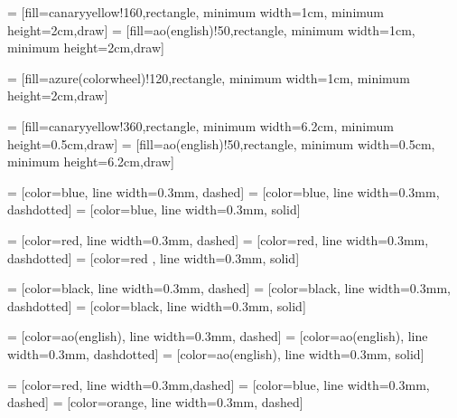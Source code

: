  = [fill=canaryyellow!160,rectangle, minimum width=1cm, minimum height=2cm,draw]
 = [fill=ao(english)!50,rectangle, minimum width=1cm, minimum height=2cm,draw]

 = [fill=azure(colorwheel)!120,rectangle, minimum width=1cm, minimum height=2cm,draw]

 = [fill=canaryyellow!360,rectangle, minimum width=6.2cm, minimum height=0.5cm,draw]
 = [fill=ao(english)!50,rectangle, minimum width=0.5cm, minimum height=6.2cm,draw]




                = [color=blue, line width=0.3mm, dashed]
   = [color=blue, line width=0.3mm, dashdotted]
  = [color=blue, line width=0.3mm, solid]

                = [color=red, line width=0.3mm, dashed]
   = [color=red, line width=0.3mm, dashdotted]
  = [color=red , line width=0.3mm, solid]


        =  [color=black, line width=0.3mm, dashed] 
  =  [color=black, line width=0.3mm, dashdotted]
 =  [color=black, line width=0.3mm, solid]

        =  [color=ao(english), line width=0.3mm, dashed] 
  =  [color=ao(english), line width=0.3mm, dashdotted]
 =  [color=ao(english), line width=0.3mm, solid]


                = [color=red, line width=0.3mm,dashed]
   = [color=blue, line width=0.3mm, dashed]
  = [color=orange, line width=0.3mm, dashed]

